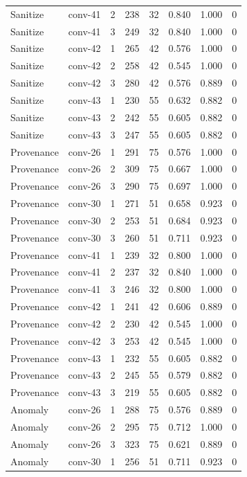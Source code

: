 \begin{longtable}{llrrrrrr}
Sanitize & conv-41 & 2 & 238 & 32 & 0.840 & 1.000 & 0 \\
Sanitize & conv-41 & 3 & 249 & 32 & 0.840 & 1.000 & 0 \\
Sanitize & conv-42 & 1 & 265 & 42 & 0.576 & 1.000 & 0 \\
Sanitize & conv-42 & 2 & 258 & 42 & 0.545 & 1.000 & 0 \\
Sanitize & conv-42 & 3 & 280 & 42 & 0.576 & 0.889 & 0 \\
Sanitize & conv-43 & 1 & 230 & 55 & 0.632 & 0.882 & 0 \\
Sanitize & conv-43 & 2 & 242 & 55 & 0.605 & 0.882 & 0 \\
Sanitize & conv-43 & 3 & 247 & 55 & 0.605 & 0.882 & 0 \\
Provenance & conv-26 & 1 & 291 & 75 & 0.576 & 1.000 & 0 \\
Provenance & conv-26 & 2 & 309 & 75 & 0.667 & 1.000 & 0 \\
Provenance & conv-26 & 3 & 290 & 75 & 0.697 & 1.000 & 0 \\
Provenance & conv-30 & 1 & 271 & 51 & 0.658 & 0.923 & 0 \\
Provenance & conv-30 & 2 & 253 & 51 & 0.684 & 0.923 & 0 \\
Provenance & conv-30 & 3 & 260 & 51 & 0.711 & 0.923 & 0 \\
Provenance & conv-41 & 1 & 239 & 32 & 0.800 & 1.000 & 0 \\
Provenance & conv-41 & 2 & 237 & 32 & 0.840 & 1.000 & 0 \\
Provenance & conv-41 & 3 & 246 & 32 & 0.800 & 1.000 & 0 \\
Provenance & conv-42 & 1 & 241 & 42 & 0.606 & 0.889 & 0 \\
Provenance & conv-42 & 2 & 230 & 42 & 0.545 & 1.000 & 0 \\
Provenance & conv-42 & 3 & 253 & 42 & 0.545 & 1.000 & 0 \\
Provenance & conv-43 & 1 & 232 & 55 & 0.605 & 0.882 & 0 \\
Provenance & conv-43 & 2 & 245 & 55 & 0.579 & 0.882 & 0 \\
Provenance & conv-43 & 3 & 219 & 55 & 0.605 & 0.882 & 0 \\
Anomaly & conv-26 & 1 & 288 & 75 & 0.576 & 0.889 & 0 \\
Anomaly & conv-26 & 2 & 295 & 75 & 0.712 & 1.000 & 0 \\
Anomaly & conv-26 & 3 & 323 & 75 & 0.621 & 0.889 & 0 \\
Anomaly & conv-30 & 1 & 256 & 51 & 0.711 & 0.923 & 0 \\

\end{longtable}
